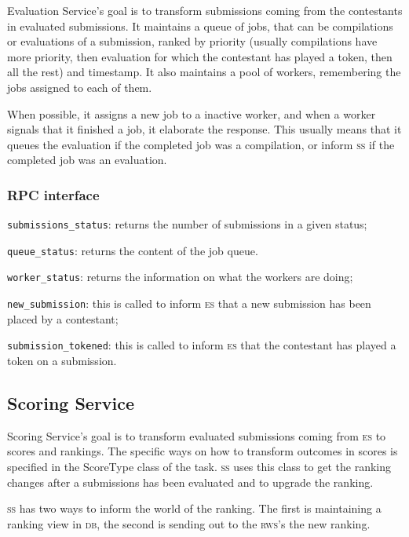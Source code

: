 \documentclass[a4paper,8pt]{amsart}
\newcommand{\DB}{\textsc{db}}
\newcommand{\ES}{\textsc{es}}
\renewcommand{\SS}{\textsc{ss}}
\newcommand{\RWS}{\textsc{rws}}
\newenvironment{squishlist}{%
  \begin{list}{\textbullet}%
    { \setlength{\itemsep}{0pt}%
      \setlength{\parsep}{3pt}%
      \setlength{\topsep}{3pt}%
      \setlength{\partopsep}{0pt}%
      \setlength{\leftmargin}{1.5em}%
      \setlength{\labelwidth}{1em}%
      \setlength{\labelsep}{0.5em} }%
}{\end{list}}
\newcommand{\id}[1]{\texttt{#1}}
\begin{document}
\begin{multicols}{2}
  Evaluation Service's goal is to transform submissions coming from the
  contestants in evaluated submissions. It maintains a queue of jobs,
  that can be compilations or evaluations of a submission, ranked by
  priority (usually compilations have more priority, then evaluation
  for which the contestant has played a token, then all the rest) and
  timestamp. It also maintains a pool of workers, remembering the jobs
  assigned to each of them.

  When possible, it assigns a new job to a inactive worker, and when a
  worker signals that it finished a job, it elaborate the
  response. This usually means that it queues the evaluation if the
  completed job was a compilation, or inform \SS{} if the completed
  job was an evaluation.

  \subsubsection{RPC interface}

  \begin{squishlist}
  \item \id{submissions\_status}: returns the number of submissions in
    a given status;
  \item \id{queue\_status}: returns the content of the job queue.
  \item \id{worker\_status}: returns the information on what the
    workers are doing;
  \item \id{new\_submission}: this is called to inform \ES{} that a new
    submission has been placed by a contestant;
  \item \id{submission\_tokened}: this is called to inform \ES{} that
    the contestant has played a token on a submission.
  \end{squishlist}

  \subsection{Scoring Service}

  Scoring Service's goal is to transform evaluated submissions coming
  from \ES{} to scores and rankings. The specific ways on how to
  transform outcomes in scores is specified in the ScoreType class of
  the task. \SS{} uses this class to get the ranking changes after a
  submissions has been evaluated and to upgrade the ranking.

  \SS{} has two ways to inform the world of the ranking. The first is
  maintaining a ranking view in \DB{}, the second is sending out to
  the \RWS{}'s the new ranking.


\end{multicols}
\end{document}
